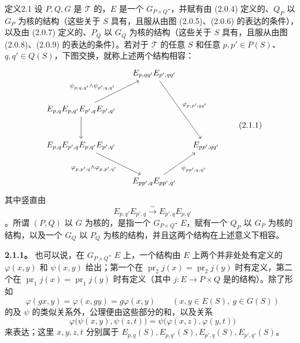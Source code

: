 \begin{SGAresult}{定义}{2.1}
设 $P,Q,G$ 是 $\mathcal T$ 的，$E$ 是一个 $G_{P\times Q}$-，并赋有由 (2.0.4) 定义的、$Q_P$ 以 $G_P$ 为核的结构（这些关于 $S$ 具有，且服从由图 (2.0.5)、(2.0.6) 的表达的条件），以及由 (2.0.7) 定义的、$P_Q$ 以 $G_Q$ 为核的结构（这些关于 $S$ 具有，且服从由图 (2.0.8)、(2.0.9) 的表达的条件）。若对于 $\mathcal T$ 的任意 $S$ 和任意 $p,p'\in P(S)$、$q,q'\in Q(S)$，下图交换，就称上述两个结构相容：
\[
\begin{tikzcd}[column sep=small,row sep=large]
&E_{p,qq'}E_{p',qq'}\arrow[ddr,"{\varphi_{p,p';qq'}}"]&\\
E_{p,q}E_{p,q'}E_{p',q}E_{p',q'}\arrow[ur,"{\psi_{p;q,q'}\wedge\psi_{p';q,q'}}"]\arrow[d]&&\\
E_{p,q}E_{p',q}E_{p,q'}E_{p',q'}\arrow[dr,"{\varphi_{p,p';q}\wedge\varphi_{p,p';q'}}"']&&E_{pp',qq'}\\
&E_{pp',q}E_{pp',q'}\arrow[ur,"{\psi_{pp';q,q'}}"']&
\end{tikzcd}
\tag{2.1.1}
\]
其中竖直由
\[
E_{p,q'}E_{p',q}\xrightarrow{\sim}E_{p',q}E_{p,q'}
\]
。所谓 $(P,Q)$ 以 $G$ 为核的，是指一个 $G_{P\times Q}$- $E$，赋有一个 $Q_P$ 以 $G_P$ 为核的结构，以及一个 $G_Q$ 以 $P_Q$ 为核的结构，并且这两个结构在上述意义下相容。
\end{SGAresult}

\textbf{2.1.1。} 也可以说，在 $G_{P\times Q}$- $E$ 上，一个结构由 $E$ 上两个并非处处有定义的 $\varphi(x,y)$ 和 $\psi(x,y)$ 给出；第一个在 $\operatorname{pr}_2j(x)=\operatorname{pr}_2j(y)$ 时有定义，第二个在 $\operatorname{pr}_1j(x)=\operatorname{pr}_1j(y)$ 时有定义（其中 $j:E\to P\times Q$ 是的结构）。除了形如
\[
\varphi(gx,y)=\varphi(x,gy)=g\varphi(x,y)\qquad(x,y\in E(S),\ g\in G(S))\tag{2.1.1.1}
\]
的及 $\psi$ 的类似关系外，公理便由这些部分的和，以及关系
\[
\varphi\bigl(\psi(x,y),\psi(z,t)\bigr)=\psi\bigl(\varphi(x,z),\varphi(y,t)\bigr)\tag{2.1.1.2}
\]
来表达；这里 $x,y,z,t$ 分别属于 $E_{p,q}(S),E_{p,q'}(S),E_{p',q}(S),E_{p',q'}(S)$。

